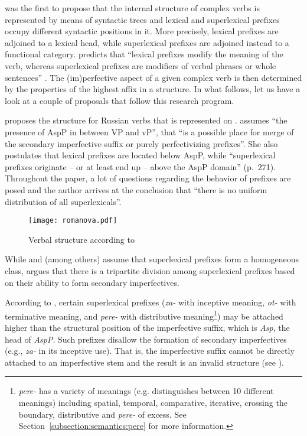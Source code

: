 \citet{Babko-Malaya:99} was the first to propose that the internal structure of complex verbs is represented by means of syntactic trees and lexical and superlexical prefixes occupy different syntactic positions in it. More precisely, lexical prefixes are adjoined to a lexical head, while superlexical prefixes are adjoined instead to a functional category. \citeauthor{Babko-Malaya:99} predicts that ``lexical prefixes modify the meaning of the verb, whereas superlexical prefixes are modifiers of verbal phrases or whole sentences'' \citep[76]{Babko-Malaya:99}. The (im)perfective aspect of a given complex verb is then determined by the properties of the highest affix in a structure. In what follows, let us have a look at a couple of proposals that follow this research program. 

\citet{Romanova:04} proposes the structure for Russian verbs that is represented on . \citet[272]{Romanova:04} assumes ``the presence of AspP in between VP and vP'', that ``is a possible place for merge of the secondary imperfective suffix or purely perfectivizing prefixes''. She also postulates that lexical prefixes are located below AspP, while ``superlexical prefixes originate -- or at least end up -- above the AspP domain'' (p.~271). Throughout the paper, a lot of questions regarding the behavior of prefixes are posed and the author arrives at the conclusion that ``there is no uniform distribution of all superlexicals''.

\begin{figure}
\begin{center}
\texttt{[image: romanova.pdf]}
\caption{\label{fig:romanova} Verbal structure according to \citet[272]{Romanova:04}}
\end{center}
\end{figure}
While \citet{Babko-Malaya:99} and \citet{Schoorlemmer:95} (among others) assume that superlexical prefixes form a homogeneous class, \citet{Svenonius:04b} argues that there is a tripartite division among superlexical prefixes based on their ability to form secondary imperfectives.

According to \citet{Svenonius:04b}, certain superlexical prefixes (\textit{za-} with inceptive meaning, \textit{ot-} with terminative meaning, and \textit{pere-} with distributive meaning\footnote{\textit{pere-} has a variety of meanings (e.g. \citealt{Shvedova:82} distinguishes between 10 different meanings) including spatial, temporal, comparative, iterative, crossing the boundary, distributive and \textit{pere-} of excess. See Section~\ref{subsection:semantics:pere} for more information.}) may be attached higher than the structural position of the imperfective suffix, which is \textit{Asp}, the head of \textit{AspP}. Such prefixes disallow the formation of secondary imperfectives (e.g., \textit{za-} in its inceptive use). That is, the imperfective suffix cannot be directly attached to an imperfective stem and the result is an invalid structure (see ).

